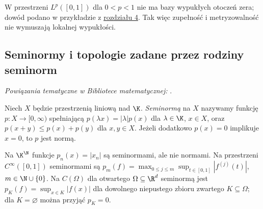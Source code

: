 \begin{uwaga}
W przestrzeni $L^p([0,1])$ dla $0<p<1$ nie ma bazy
wypukłych otoczeń zera; dowód podano w
przykładzie z \hyperref[sec:rodziny-metryzowalnosc]{rozdziału 4}.
Tak więc zupełność i metryzowalność nie wymuszają lokalnej wypukłości.
\end{uwaga}

\subsection{Seminormy i topologie zadane przez rodziny seminorm}

\noindent\emph{Powiązania tematyczne w Bibliotece matematycznej:} .


\begin{definicja}[Seminorma]
Niech $X$ będzie przestrzenią liniową nad $\K$.
\emph{Seminormą} na $X$ nazywamy funkcję
$p:X\to[0,\infty)$ spełniającą
$p(\lambda x)=|\lambda|p(x)$ dla $\lambda\in\K$, $x\in X$,
oraz $p(x+y)\le p(x)+p(y)$ dla $x,y\in X$.
Jeżeli dodatkowo $p(x)=0$ implikuje $x=0$, to $p$ jest normą.
\end{definicja}

\begin{przyklad}
Na $\K^{\N}$ funkcje $p_n(x)=|x_n|$ są seminormami, ale
nie normami. Na przestrzeni $C^\infty([0,1])$ seminormami są
$p_m(f)=\max_{0\le j\le m}\sup_{t\in[0,1]}|f^{(j)}(t)|$,
$m\in\N\cup\{0\}$. Na $C(\Omega)$ dla otwartego
$\Omega\subseteq\R^d$ seminormą jest
$p_K(f)=\sup_{x\in K}|f(x)|$ dla dowolnego niepustego
zbioru zwartego $K\subseteq\Omega$; dla $K=\varnothing$
można przyjąć $p_K=0$.
\end{przyklad}

